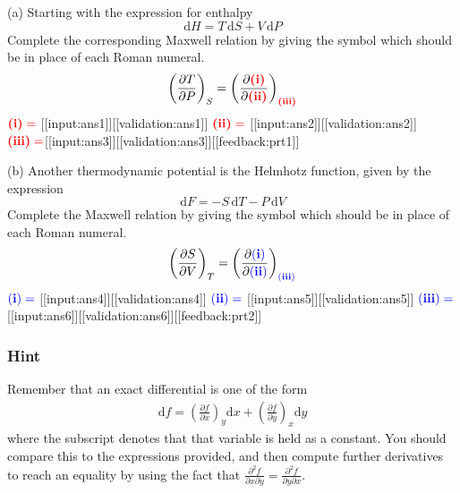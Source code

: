 \documentclass[a4paper,10pt]{article}
\begin{document}
(a) Starting with the expression for enthalpy \[ \text{d}H = T \, \text{d}S + V \, \text{d}P \] Complete the corresponding Maxwell relation by giving the symbol which should be in place of each Roman numeral. \[ \left(\frac{\partial T}{\partial P}\right)_{S} = \left(\frac{\partial \color{red}{\textbf{(i)}}}{\partial \color{red}{\textbf{(ii)}}}\right)_{\color{red}{\textbf{(iii)}}} \]
\( \color{red}{\textbf{(i)}} =\) [[input:ans1]][[validation:ans1]]
\( \color{red}{\textbf{(ii)}} =\) [[input:ans2]][[validation:ans2]]
\( \color{red}{\textbf{(iii)}} =\)[[input:ans3]][[validation:ans3]][[feedback:prt1]]

(b) Another thermodynamic potential is the Helmhotz function, given by the expression \[ \text{d}F = -S \, \text{d}T - P \, \text{d}V \] Complete the Maxwell relation by giving the symbol which should be in place of each Roman numeral. \[ \left(\frac{\partial S}{\partial V}\right)_{T} = \left(\frac{\partial \color{blue}{\mathbf{(i)}}}{\partial \color{blue}{\mathbf{(ii)}}}\right)_{\color{blue}{\mathbf{(iii)}}} \]
\( \color{blue}{\mathbf{(i)}} =\) [[input:ans4]][[validation:ans4]]
\( \color{blue}{\mathbf{(ii)}} =\) [[input:ans5]][[validation:ans5]]
\(\color{blue}{\mathbf{(iii)}} =\) [[input:ans6]][[validation:ans6]][[feedback:prt2]]
\subsubsection{Hint}
Remember that an exact differential is one of the form \begin{align*} \text{d}f = \left(\frac{\partial f}{\partial x}\right)_y \text{d}x + \left(\frac{\partial f}{\partial y}\right)_x \text{d}y \end{align*} where the subscript denotes that that variable is held as a constant. You should compare this to the expressions provided, and then compute further derivatives to reach an equality by using the fact that $\frac{\partial^2 f}{\partial x \partial y} = \frac{\partial^2 f}{\partial y \partial x}$.
\end{document}
